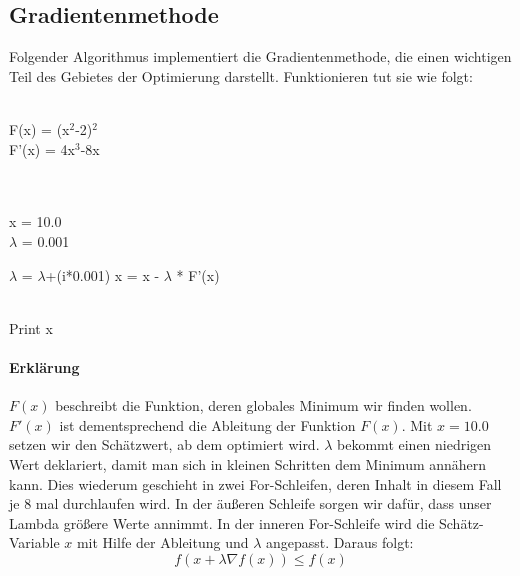 \subsection{Gradientenmethode}

Folgender Algorithmus implementiert die Gradientenmethode, die einen wichtigen Teil des Gebietes der Optimierung darstellt. Funktionieren tut sie wie folgt:
\begin{algorithmic}[1]

   \\F(x) = (x$^2$-2)$^2$
\\F'(x) = 4x$^3$-8x

\\
\\x = 10.0
\\$\lambda$ = 0.001

 \State $\lambda$ = $\lambda$+(i*0.001)
    \State x = x - $\lambda$ * F'(x)
  \EndFor
\EndFor
 
 
\\Print x\EndProcedure
\Statex
\end{algorithmic}

\paragraph{Erklärung}
$F(x)$ beschreibt die Funktion, deren globales Minimum wir finden wollen. $F'(x)$ ist dementsprechend die Ableitung der Funktion $F(x)$. Mit $x=10.0$ setzen wir den Schätzwert, ab dem optimiert wird. $\lambda$ bekommt einen niedrigen Wert deklariert, damit man sich in kleinen Schritten dem Minimum annähern kann. Dies wiederum geschieht in zwei For-Schleifen, deren Inhalt in diesem Fall je 8 mal durchlaufen wird. In der äußeren Schleife sorgen wir dafür, dass unser Lambda größere Werte annimmt. In der inneren For-Schleife wird die Schätz-Variable $x$ mit Hilfe der Ableitung und $\lambda$ angepasst. Daraus folgt:
\begin{equation*}
 f(x+\lambda \nabla f(x)) \leq f(x)
 \end{equation*}


